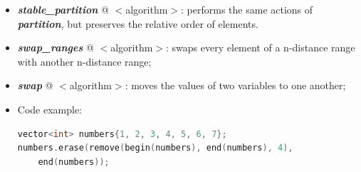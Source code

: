 \documentclass[10pt]{article}
\begin{document}
\begin{multicols*}{4}
{\begin{itemize}[leftmargin=*,topsep=0.25pt]
	\item  \emph{\textbf{stable\_partition}} @ $<$algorithm$>$: performs the same actions of  \emph{\textbf{partition}}, but preserves the relative order of elements. 
	\item  \emph{\textbf{swap\_ranges}} @ $<$algorithm$>$: swaps every element of a n-distance range with another n-distance range;
	\item  \emph{\textbf{swap}} @ $<$algorithm$>$: moves the values of two variables to one another;
\item Code example:
{\selectfont \lstset{style=mystyle}
 \begin{lstlisting}[language=C++]
vector<int> numbers{1, 2, 3, 4, 5, 6, 7};
numbers.erase(remove(begin(numbers), end(numbers), 4), 
	end(numbers));
\end{lstlisting}
 }

\end{itemize}

}
\end{multicols*}
\end{document}
